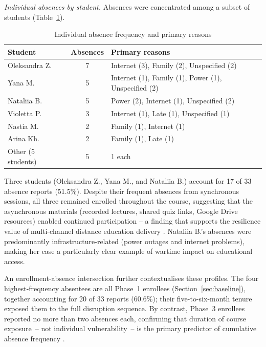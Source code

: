 \textit{Individual absences by student.} Absences were concentrated among a subset of students (Table~\ref{tab:individual-absence}).

\begin{table}[!h]
\centering
\caption{Individual absence frequency and primary reasons}
\label{tab:individual-absence}
\small
\begin{tabular}{lcl}
\hline
\textbf{Student} & \textbf{Absences} & \textbf{Primary reasons} \\
\hline
Oleksandra Z. & 7 & Internet (3), Family (2), Unspecified (2) \\
Yana M. & 5 & Internet (1), Family (1), Power (1), Unspecified (2) \\
Nataliia B. & 5 & Power (2), Internet (1), Unspecified (2) \\
Violetta P. & 3 & Internet (1), Late (1), Unspecified (1) \\
Nastia M. & 2 & Family (1), Internet (1) \\
Arina Kh. & 2 & Family (1), Late (1) \\
Other (5 students) & 5 & 1 each \\
\hline
\end{tabular}
\end{table}

Three students (Oleksandra Z., Yana M., and Nataliia B.) account for 17 of 33 absence reports (51.5\%). Despite their frequent absences from synchronous sessions, all three remained enrolled throughout the course, suggesting that the asynchronous materials (recorded lectures, shared quiz links, Google Drive resources) enabled continued participation -- a finding that supports the resilience value of multi-channel distance education delivery \cite{Tamim2011, UNESCO2023}. Nataliia B.'s absences were predominantly infrastructure-related (power outages and internet problems), making her case a particularly clear example of wartime impact on educational access.

An enrollment-absence intersection further contextualises these profiles. The four highest-frequency absentees are all Phase~1 enrollees (Section~\ref{sec:baseline}), together accounting for 20 of 33 reports (60.6\%); their five-to-six-month tenure exposed them to the full disruption sequence. By contrast, Phase~3 enrollees reported no more than two absences each, confirming that duration of course exposure~-- not individual vulnerability~-- is the primary predictor of cumulative absence frequency \cite{Humeniuk2022113}.


